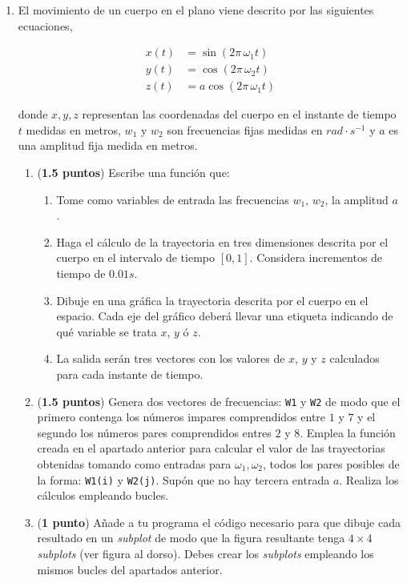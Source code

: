 \begin{enumerate}

\item  El movimiento de un cuerpo en el plano viene descrito por las siguientes ecuaciones,

\begin{align}
x(t) &= \sin(2 \pi \, \omega_1 t)\\
y(t) &= \cos(2 \pi \, \omega_2 t)\\
z(t) &= a\cos(2\pi \, \omega_1 t) \label{eq:3}
\end{align}

donde $x,y,z$ representan las coordenadas del cuerpo en el instante de tiempo $t$ medidas en metros,  $w_1$ y $w_2$ son frecuencias fijas medidas en $rad\cdot s^{-1}$ y $a$ es una amplitud fija medida en metros.

\begin{enumerate}
	\item \label{ap1} (\textbf{1.5 puntos}) Escribe una función que:

\begin{enumerate}
	\item Tome como variables de entrada las frecuencias $w_1$, $w_2$, la amplitud $a$ .
	\item Haga el cálculo de la trayectoria en tres dimensiones descrita por el cuerpo en el intervalo de tiempo $[0,1]$. Considera incrementos de tiempo de $0.01s$.
	\item Dibuje en una gráfica la trayectoria descrita por el cuerpo en el espacio. Cada eje del gráfico deberá llevar  una etiqueta indicando de qué variable se trata $x$, $y$ ó $z$.
	\item La salida serán tres vectores con los valores de $x$, $y$ y $z$ calculados para cada instante de tiempo.
	\end{enumerate}

\item \label{ap2} (\textbf{1.5 puntos}) Genera dos  vectores de frecuencias: \texttt{W1} y \texttt{W2} de  modo que el primero contenga los números impares comprendidos entre $1$ y $7$ y el segundo los números pares comprendidos entres $2$ y $8$.  Emplea la función creada en el apartado anterior para calcular el valor de las trayectorias obtenidas tomando como entradas para  $\omega_1, \omega_2$,  todos los pares posibles de la forma: \texttt{W1(i)} y \texttt{W2(j)}. Supón que no hay tercera entrada $a$. Realiza los cálculos empleando bucles.

\item (\textbf{1 punto}) Añade a tu programa el código necesario para que dibuje cada resultado en un \emph{subplot} de modo que la figura resultante tenga $4\times4$ \emph{subplots} (ver figura al dorso).  Debes crear los \emph{subplots} empleando los mismos bucles del apartados anterior. 


\end{enumerate}
\end{enumerate}
